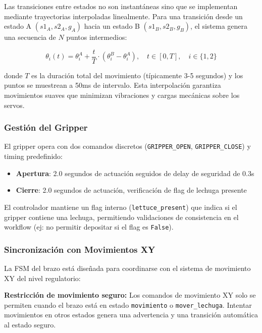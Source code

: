 Las transiciones entre estados no son instantáneas sino que se implementan mediante trayectorias interpoladas linealmente. Para una transición desde un estado A $(s1_A, s2_A, g_A)$ hacia un estado B $(s1_B, s2_B, g_B)$, el sistema genera una secuencia de $N$ puntos intermedios:

\begin{equation}
\theta_i(t) = \theta_i^A + \frac{t}{T} \cdot (\theta_i^B - \theta_i^A), \quad t \in [0, T], \quad i \in \{1, 2\}
\end{equation}

donde $T$ es la duración total del movimiento (típicamente 3-5 segundos) y los puntos se muestrean a 50ms de intervalo. Esta interpolación garantiza movimientos suaves que minimizan vibraciones y cargas mecánicas sobre los servos.

\subsubsection{Gestión del Gripper}

El gripper opera con dos comandos discretos (\texttt{GRIPPER\_OPEN}, \texttt{GRIPPER\_CLOSE}) y timing predefinido:

\begin{itemize}[label=$\bullet$]
    \item \textbf{Apertura}: 2.0 segundos de actuación seguidos de delay de seguridad de 0.3s
    \item \textbf{Cierre}: 2.0 segundos de actuación, verificación de flag de lechuga presente
\end{itemize}

El controlador mantiene un flag interno (\texttt{lettuce\_present}) que indica si el gripper contiene una lechuga, permitiendo validaciones de consistencia en el workflow (ej: no permitir depositar si el flag es \texttt{False}).

\subsubsection{Sincronización con Movimientos XY}

La FSM del brazo está diseñada para coordinarse con el sistema de movimiento XY del nivel regulatorio:

\textbf{Restricción de movimiento seguro:} Los comandos de movimiento XY solo se permiten cuando el brazo está en estado \texttt{movimiento} o \texttt{mover\_lechuga}. Intentar movimientos en otros estados genera una advertencia y una transición automática al estado seguro.


